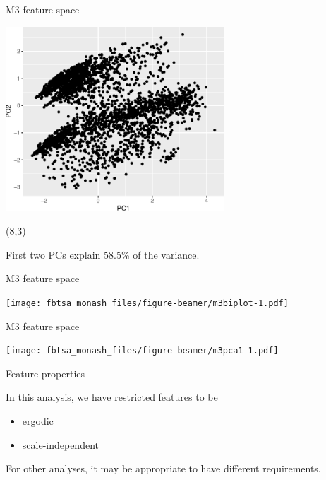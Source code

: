 \documentclass[14pt,ignorenonframetext,]{beamer}
\providecommand{\tightlist}{%
  \setlength{\itemsep}{0pt}\setlength{\parskip}{0pt}}
\begin{document}
\begin{frame}{M3 feature space}
\protect\hypertarget{m3-feature-space}{}

\fontsize{11}{11}\sf

\vspace*{-0.2cm}

\includegraphics[width=8.2cm]{FeatureSpace}

\begin{textblock}{4}(8,3)
\begin{block}{}\fontsize{12}{13}\sf
First two PCs explain 58.5\% of the variance.
\end{block}
\end{textblock}

\end{frame}

\begin{frame}{M3 feature space}
\protect\hypertarget{m3-feature-space-1}{}

\texttt{[image: fbtsa\_monash\_files/figure-beamer/m3biplot-1.pdf]}

\end{frame}

\begin{frame}{M3 feature space}
\protect\hypertarget{m3-feature-space-2}{}

\texttt{[image: fbtsa\_monash\_files/figure-beamer/m3pca1-1.pdf]}

\end{frame}

\begin{frame}{Feature properties}
\protect\hypertarget{feature-properties}{}

In this analysis, we have restricted features to be

\begin{itemize}
\tightlist
\item
  ergodic
\item
  scale-independent
\end{itemize}

For other analyses, it may be appropriate to have different
requirements.

\end{frame}
\end{document}

